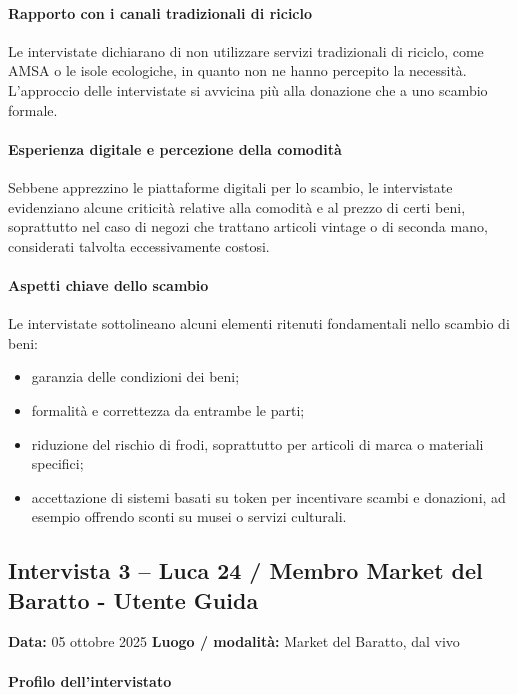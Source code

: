\documentclass[12pt,a4paper]{article}
\begin{document}
\paragraph{Rapporto con i canali tradizionali di riciclo}

Le intervistate dichiarano di non utilizzare servizi tradizionali di riciclo, come AMSA o le isole ecologiche, in quanto non ne hanno percepito la necessità. L’approccio delle intervistate si avvicina più alla donazione che a uno scambio formale.

\paragraph{Esperienza digitale e percezione della comodità}

Sebbene apprezzino le piattaforme digitali per lo scambio, le intervistate evidenziano alcune criticità relative alla comodità e al prezzo di certi beni, soprattutto nel caso di negozi che trattano articoli vintage o di seconda mano, considerati talvolta eccessivamente costosi.

\paragraph{Aspetti chiave dello scambio}

Le intervistate sottolineano alcuni elementi ritenuti fondamentali nello scambio di beni:
\begin{itemize}
  \item garanzia delle condizioni dei beni;
  \item formalità e correttezza da entrambe le parti;
  \item riduzione del rischio di frodi, soprattutto per articoli di marca o materiali specifici;
  \item accettazione di sistemi basati su token per incentivare scambi e donazioni, ad esempio offrendo sconti su musei o servizi culturali.
\end{itemize}

\newpage

\subsection{Intervista 3 – Luca 24 / Membro Market del Baratto - Utente Guida}
\textbf{Data:} 05 ottobre 2025  
\textbf{Luogo / modalità:} Market del Baratto, dal vivo  

\paragraph{Profilo dell’intervistato}
\end{document}
